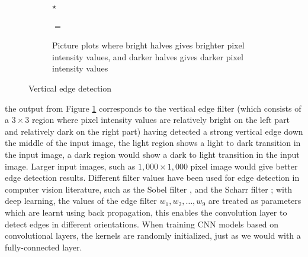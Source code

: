 \documentclass[12pt]{report}
\numberwithin{equation}{section}
\begin{document}
\begin{figure}[H]
	\begin{subfigure}[t]{.7\linewidth}
	\centering
	\hspace{0.4mm}
	$\star$
	\hspace{0.4mm}
	\hspace{0.4mm}
	$=$
	\hspace{0.4mm}
	\caption{Picture plots where bright halves gives brighter pixel intensity values, and darker halves gives darker pixel intensity values}	 
	\label{subfig:detection1}
	\end{subfigure}
\caption{Vertical edge detection}	 
\label{fig:detection}
\end{figure} 
\noindent
the output from Figure \ref{subfig:detection1} corresponds to the vertical edge filter (which consists of a $3 \times 3$ region where pixel intensity values are relatively bright on the left part and relatively dark on the right part) having detected a strong vertical edge down the middle of the input image, the light region shows a light to dark transition in the input image, a dark region would show a dark to light transition in the input image. Larger input images, such as $1,000 \times 1,000$ pixel image would give better edge detection results. Different filter values have been used for edge detection in computer vision literature, such as the Sobel filter {\cite{sobel19683x3}}, and the Scharr filter {\cite{jaehne1999k}}; with deep learning, the values of the edge filter $w_1,w_2,\hdots,w_9$ are treated as parameters which are learnt using back propagation, this enables the convolution layer to detect edges in different orientations. When training CNN models based on convolutional layers, the kernels are randomly initialized, just as we would with a fully-connected layer.  
\end{document}
